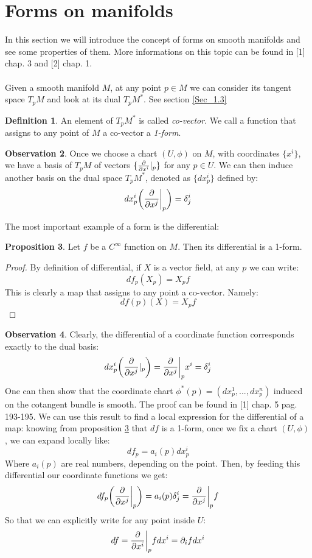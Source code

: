 \documentclass[12pt,a4paper]{report}
\theoremstyle{definition}
\newtheorem{Def}{Definition}[chapter]
\theoremstyle{Theorem}
\newtheorem{Prop}[Def]{Proposition}
\theoremstyle{definition}
\theoremstyle{definition}
\newtheorem{Obs}[Def]{Observation}
\begin{document}
	\section{Forms on manifolds}
	In this section we will introduce the concept of forms on smooth manifolds and see some properties of them. More informations on this topic can be found in [1] chap. 3 and [2] chap. 1.\\
	\\
	Given a smooth manifold $M$, at any point $p\in M$ we can consider its tangent space $T_pM$ and look at its dual $T_pM^*$. See section \ref{Sec_1.3} 
	\begin{Def}
		An element of $T_pM^*$ is called \textit{co-vector}. We call a function that assigns to any point of $M$ a co-vector a \textit{1-form}.
	\end{Def}
	\begin{Obs}
		Once we choose a chart $(U,\phi)$ on $M$, with coordinates $\{x^i\}$, we have a basis of $T_pM$ of vectors $\{{\partial\over \partial x^i}|_p\}$ for any $p\in U$. We can then induce another basis on the dual space $T_pM^*$, denoted as $\{dx^i_p\}$ defined by:
		$$dx^i_p\bigg({\partial\over \partial x^j}\bigg|_p\bigg)=\delta^i_j$$
	\end{Obs}
	\begin{comment}
		\begin{Obs}
			Note that on a metric manifold $(M,g)$, after choosing a chart, we can expand the metric tensor in local coordinates:
			$$g=g_{ij}dx^i\otimes dx^j$$  
		\end{Obs}
	\end{comment}
	The most important example of a form is the differential:
	\begin{Prop} \label{df_is_a_form}
		Let $f$ be a $C^\infty$ function on $M$. Then its differential is a 1-form.
	\end{Prop}
	\begin{proof}
		By definition of differential, if $X$ is a vector field, at any $p$ we can write:
		$$df_p(X_p)=X_pf$$
		This is clearly a map that assigns to any point a co-vector. Namely:
		$$df(p)(X)=X_pf$$
	\end{proof}
	\begin{Obs}
		Clearly, the differential of a coordinate function corresponds exactly to the dual basis:
		$$dx^i_p\bigg({\partial\over \partial x^j}|_p\bigg)={\partial\over \partial x^j}\bigg|_px^i=\delta^i_j$$
		One can then show that the coordinate chart $\phi^*(p)=(dx^1_p,...,dx^n_p)$ induced on the cotangent bundle is smooth. The proof can be found in [1] chap. 5 pag. 193-195.
		We can use this result to find a local expression for the differential of a map:
		knowing from proposition \ref{df_is_a_form} that $df$ is a 1-form, once we fix a chart $(U,\phi)$, we can expand locally like:
		$$df_p=a_i(p)dx^i_p$$
		Where $a_i(p)$ are real numbers, depending on the point.
		Then, by feeding this differential our coordinate functions we get:
		$$df_p\bigg({\partial\over \partial x^j}\bigg|_p\bigg)=a_i(p)\delta^i_j={\partial\over \partial x^j}\bigg|_pf$$
		So that we can explicitly write for any point inside $U$:
		$$df={\partial\over \partial x^i}\bigg|_pfdx^i=\partial_ifdx^i$$
	\end{Obs}
\end{document}
